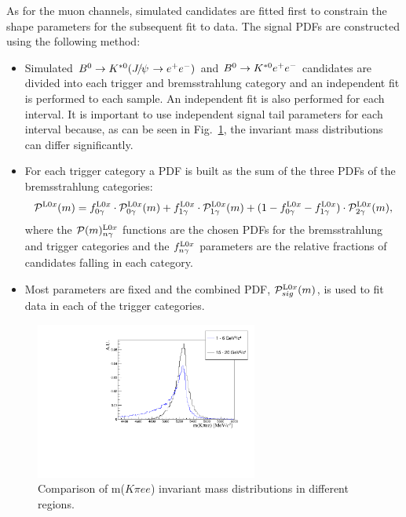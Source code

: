 As for the muon channels, simulated candidates are fitted first to constrain
the shape parameters for the subsequent fit to data. The signal PDFs are constructed using the following method:
%
\begin{itemize}
\item Simulated $\Bz\to\Kstarz(\jpsi\to \ee)$ and ${{B}^0}\rightarrow{\ensuremath{{K}^{*0}}} e^+ e^-$ candidates are divided
into each trigger and bremsstrahlung category and an independent fit is performed to each sample.
An independent fit is also performed for each \qsq interval. It is important to use independent signal tail parameters 
for each \qsq interval because, as can be seen in Fig.~\ref{fig:high_central_mass_comparison}, the invariant mass
distributions can differ significantly.
\vspace{2cm}
\item For each trigger category a PDF is built as the sum of the three PDFs of the bremsstrahlung categories:
\begin{equation}
\mathcal{P}^{{\rm L0}x}(m) = f^{{\rm L0}x}_{0\gamma} \cdot \mathcal{P}^{{\rm L0}x}_{0\gamma}(m) + f^{{\rm L0}x}_{1\gamma} \cdot \mathcal{P}^{{\rm L0}x}_{1\gamma}(m) + (1 - f^{{\rm L0}x}_{0\gamma} - f^{{\rm L0}x}_{1\gamma}) \cdot  \mathcal{P}^{{\rm L0}x}_{2\gamma}(m),
\end{equation}
where the $\mathcal{P}(m)^{{\rm L0}x}_{n\gamma}$ functions are the chosen PDFs for the bremsstrahlung and trigger categories
and the $f^{{\rm L0}x}_{n\gamma}$ parameters are the relative fractions of candidates falling in each category.
\item Most parameters are fixed and the combined PDF, $\mathcal{P}^{{\rm L0}x}_{sig}(m)$,
is used to fit data in each of the trigger categories.
\end{itemize}
%
\begin{figure}[h!]
\centering
\includegraphics[width=0.65\textwidth]{RKst/figs/high_central_mass_comparison.pdf}
\caption{Comparison of m($K\pi ee$) invariant mass distributions in different \qsq regions.}
\label{fig:high_central_mass_comparison}
\end{figure}

